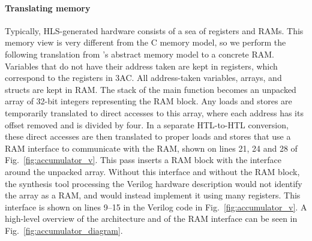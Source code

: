 \begin{figure*}
  \caption{The FSMD for the example shown in Fig.~\ref{fig:accumulator_c_rtl}, split into a data-path and control logic for the next state calculation.  The Update block takes the current state, current values of all registers and at most one value stored in the RAM, and calculates a new value that can either be stored back in the RAM or in a register.}\label{fig:accumulator_diagram}
\end{figure*}

\paragraph{Translating memory}
Typically, HLS-generated hardware consists of a sea of registers and RAMs.
This memory view is very different from the C memory model, so we perform the following translation from \compcert{}'s abstract memory model to a concrete RAM.\@
Variables that do not have their address taken are kept in registers, which correspond to the registers in 3AC.
All address-taken variables, arrays, and structs are kept in RAM.
The stack of the main function becomes an unpacked array of 32-bit integers representing the RAM block.  Any loads and stores are temporarily translated to direct accesses to this array, where each address has its offset removed and is divided by four.  In a separate HTL-to-HTL conversion, these direct accesses are then translated to proper loads and stores that use a RAM interface to communicate with the RAM, shown on lines 21, 24 and 28 of Fig.~\ref{fig:accumulator_v}.  This pass inserts a RAM block with the interface around the unpacked array.  Without this interface and without the RAM block, the synthesis tool processing the Verilog hardware description would not identify the array as a RAM, and would instead implement it using many registers.  This interface is shown on lines 9--15 in the Verilog code in Fig.~\ref{fig:accumulator_v}.
A high-level overview of the architecture and of the RAM interface can be seen in Fig.~\ref{fig:accumulator_diagram}.


